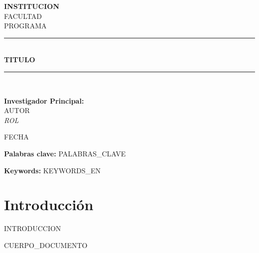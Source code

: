 \documentclass[12pt,a4paper]{article}
\begin{document}
\begin{titlepage}
  \centering
  \vspace*{1cm}
  
  {\Large \textbf{{{INSTITUCION}}}}\\[0.4cm]
  {\large {{FACULTAD}}}\\[0.2cm]
  {\large {{PROGRAMA}}}\\[1.5cm]
  
  \rule{\linewidth}{0.5mm}\\[0.6cm]
  {\Large \textbf{{{TITULO}}}}\\[0.4cm]
  \rule{\linewidth}{0.5mm}\\[2cm]
  
  \begin{minipage}{0.8\textwidth}
    \begin{center}
      \textbf{Investigador Principal:}\\[0.2cm]
      {{AUTOR}}\\[0.1cm]
      \small{\textit{{{ROL}}}}\\[1.5cm]
    \end{center}
  \end{minipage}
  
  \vfill
  {\large {{FECHA}}}
\end{titlepage}


\renewcommand{\abstractname}{Resumen}
\begin{abstract}
{{RESUMEN}}
\end{abstract}
\vspace{12pt}\noindent\textbf{Palabras clave:} {{PALABRAS_CLAVE}}
\clearpage

\renewcommand{\abstractname}{Abstract}
\begin{abstract}
{{ABSTRACT_EN}}
\end{abstract}
\vspace{12pt}\noindent\textbf{Keywords:} {{KEYWORDS_EN}}
\clearpage

\tableofcontents
\clearpage
\listoffigures
\listoftables
\clearpage

\section{Introducción}
{{INTRODUCCION}}

{{CUERPO_DOCUMENTO}}

\newpage
\printbibliography[title={Referencias Bibliográficas},heading=bibintoc]
\end{document}
